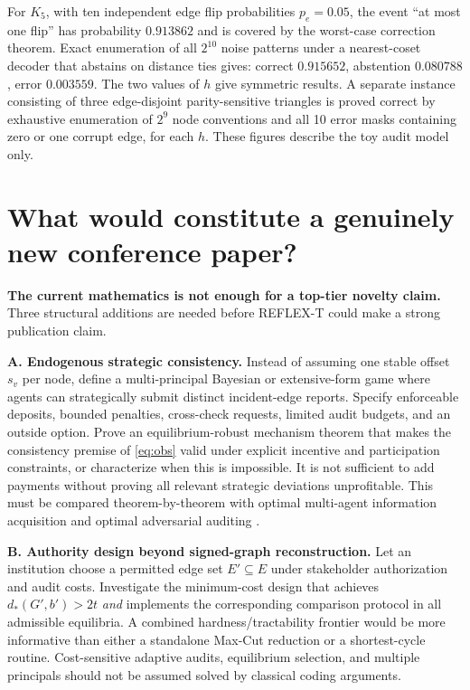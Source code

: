 \documentclass[10pt,a4paper]{article}
\theoremstyle{definition}\newtheorem{definition}[theorem]{Definition}
\begin{document}
For $K_5$, with ten independent edge flip probabilities $p_e=0.05$, the event ``at most one flip'' has probability $0.913862$ and is covered by the worst-case correction theorem. Exact enumeration of all $2^{10}$ noise patterns under a nearest-coset decoder that abstains on distance ties gives: correct $0.915652$, abstention $0.080788$, error $0.003559$. The two values of $h$ give symmetric results. A separate instance consisting of three edge-disjoint parity-sensitive triangles is proved correct by exhaustive enumeration of $2^9$ node conventions and all 10 error masks containing zero or one corrupt edge, for each $h$. These figures describe the toy audit model only.

\section{What would constitute a genuinely new conference paper?}
\textbf{The current mathematics is not enough for a top-tier novelty claim.} Three structural additions are needed before REFLEX-T could make a strong publication claim.

\textbf{A. Endogenous strategic consistency.} Instead of assuming one stable offset $s_v$ per node, define a multi-principal Bayesian or extensive-form game where agents can strategically submit distinct incident-edge reports. Specify enforceable deposits, bounded penalties, cross-check requests, limited audit budgets, and an outside option. Prove an equilibrium-robust mechanism theorem that makes the consistency premise of \eqref{eq:obs} valid under explicit incentive and participation constraints, or characterize when this is impossible. It is not sufficient to add payments without proving all relevant strategic deviations unprofitable. This must be compared theorem-by-theorem with optimal multi-agent information acquisition \cite{cacciamani2024} and optimal adversarial auditing \cite{das2026}.

\textbf{B. Authority design beyond signed-graph reconstruction.} Let an institution choose a permitted edge set $E'\subseteq E$ under stakeholder authorization and audit costs. Investigate the minimum-cost design that achieves $d_*(G',b')>2t$ \emph{and} implements the corresponding comparison protocol in all admissible equilibria. A combined hardness/tractability frontier would be more informative than either a standalone Max-Cut reduction or a shortest-cycle routine. Cost-sensitive adaptive audits, equilibrium selection, and multiple principals should not be assumed solved by classical coding arguments.
\end{document}
